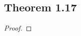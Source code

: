 \documentclass[../../main.tex]{subfiles}
\begin{document}
\subsection{Theorem 1.17}
\begin{wts}

\end{wts}
\begin{proof}

\end{proof}
\end{document}
